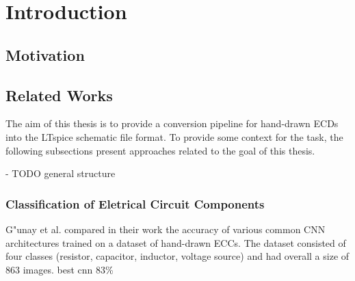 \chapter{Introduction}

\section{Motivation}

\section{Related Works}

The aim of this thesis is to provide a conversion pipeline for hand-drawn \acp{ECD} into the LTspice schematic file format.
To provide some context for the task, the following subsections present approaches related to the goal of this thesis.

- TODO general structure

\subsection{Classification of Eletrical Circuit Components}

G"unay et al. \cite{ecd_basecnn} compared in their work the accuracy of various common \ac{CNN} architectures trained on a dataset of hand-drawn \acp{ECC}.
The dataset consisted of four classes (resistor, capacitor, inductor, voltage source) and had overall a size of 863 images. best cnn 83\%










